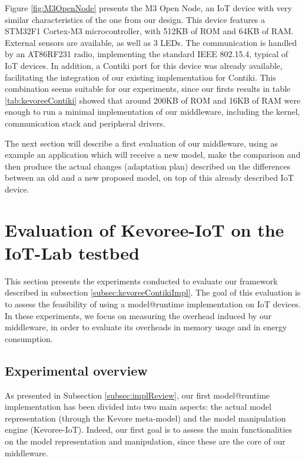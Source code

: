Figure \ref{fig:M3OpenNode} presents the M3 Open Node, an IoT device with very similar characteristics of the one from our design.
This device features a STM32F1 Cortex-M3 microcontroller, with 512KB of ROM and 64KB of RAM.
External sensors are available, as well as 3 LEDs.
The communication is handled by an AT86RF231 radio, implementing the standard IEEE 802.15.4, typical of IoT devices.
In addition, a Contiki port for this device was already available, facilitating the integration of our existing implementation for Contiki.
This combination seems suitable for our experiments, since our firsts results in table \ref{tab:kevoreeContiki} showed that around 200KB of ROM and 16KB of RAM were enough to run a minimal implementation of our middleware, including the kernel, communication stack and peripheral drivers.

The next section will describe a first evaluation of our middleware, using as example an application which will receive a new model, make the comparison and then produce the actual changes (adaptation plan) described on the differences between an old and a new proposed model, on top of this already described IoT device.

\section{Evaluation of Kevoree-IoT on the IoT-Lab testbed}
This section presents the experiments conducted to evaluate our framework described in subsection \ref{subsec:kevoreeContikiImpl}.
The goal of this evaluation is to assess the feasibility of using a model@runtime implementation on IoT devices.
In these experiments, we focus on measuring the overhead induced by our middleware, in order to evaluate its overheads in memory usage and in energy consumption.

\subsection{Experimental overview}
As presented in Subsection \ref{subsec:implReview}, our first model@runtime implementation has been divided into two main aspects: the actual model representation (through the Kevore meta-model) and the model manipulation engine (Kevoree-IoT).
Indeed, our first goal is to assess the main functionalities on the model representation and manipulation, since these are the core of our middleware.



